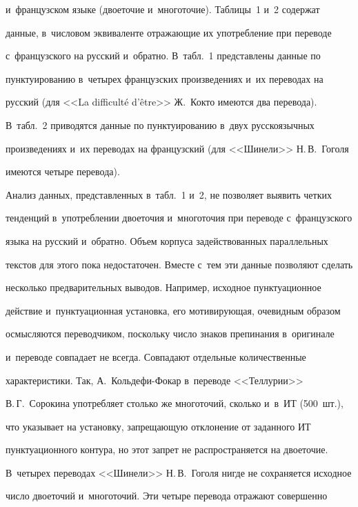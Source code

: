 и~французском языке (двоеточие и~многоточие). Таблицы~1 и~2 содержат 


данные, в~числовом эквиваленте отражающие их употребление при переводе 


с~французского на русский и~обратно. В~табл.~1 представлены данные по 


пунктуированию в~четырех французских произведениях и~их переводах на 


русский (для <<La difficult\'{e} d'\^{e}tre>> Ж.~Кокто имеются два перевода). 


В~табл.~2 приводятся данные по пунктуированию в~двух русскоязычных 


произведениях и~их переводах на французский (для <<Шинели>> Н.\,В.~Гоголя 


имеются четыре перевода).


  


  


  Анализ данных, представленных в~табл.~1 и~2, не позволяет выявить четких 


тенденций в~употреблении двоеточия и~многоточия при переводе с~французского 


языка на русский и~обратно. Объем корпуса задействованных параллельных 


текстов для этого пока недостаточен. Вместе с~тем эти данные позволяют сделать 


несколько предварительных выводов. Например, исходное пунктуационное 


действие и~пунктуационная установка, его мотивирующая, очевидным образом 


осмысляются переводчиком, поскольку число знаков препинания в~оригинале 


и~переводе совпадает не всегда. Совпадают отдельные количественные 


характеристики. Так, А.~Коль\-де\-фи-Фо\-кар в~переводе <<Теллурии>> 


В.\,Г.~Сорокина употребляет столько же многоточий, сколько и~в~ИТ (500~шт.), 


что указывает на установку, запрещающую отклонение от заданного ИТ 


пунктуационного контура, но этот запрет не распространяется на двоеточие. 


В~четырех переводах <<Шинели>> Н.\,В.~Гоголя нигде не сохраняется исходное 


число двоеточий и~многоточий. Эти четыре перевода отражают совершенно 



